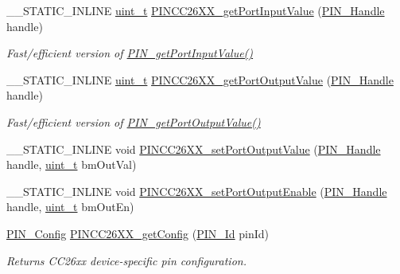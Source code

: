 \begin{DoxyCompactItemize}
\item 
\+\_\+\+\_\+\+S\+T\+A\+T\+I\+C\+\_\+\+I\+N\+L\+I\+N\+E \hyperlink{_p_i_n_8h_a12a1e9b3ce141648783a82445d02b58d}{uint\+\_\+t} \hyperlink{_p_i_n_c_c26_x_x_8h_a3fb51a5114db99572739e97b1577f5b8}{P\+I\+N\+C\+C26\+X\+X\+\_\+get\+Port\+Input\+Value} (\hyperlink{_p_i_n_8h_afb2de52b054638f63c39df1f30a0d88d}{P\+I\+N\+\_\+\+Handle} handle)
\begin{DoxyCompactList}\small\item\em Fast/efficient version of \hyperlink{_p_i_n_8h_a726e06dcb7c0d096efaee431ae7b2aaa}{P\+I\+N\+\_\+get\+Port\+Input\+Value()} \end{DoxyCompactList}\item 
\+\_\+\+\_\+\+S\+T\+A\+T\+I\+C\+\_\+\+I\+N\+L\+I\+N\+E \hyperlink{_p_i_n_8h_a12a1e9b3ce141648783a82445d02b58d}{uint\+\_\+t} \hyperlink{_p_i_n_c_c26_x_x_8h_ad9634c4a5c56298cdb2b26692f480ebe}{P\+I\+N\+C\+C26\+X\+X\+\_\+get\+Port\+Output\+Value} (\hyperlink{_p_i_n_8h_afb2de52b054638f63c39df1f30a0d88d}{P\+I\+N\+\_\+\+Handle} handle)
\begin{DoxyCompactList}\small\item\em Fast/efficient version of \hyperlink{_p_i_n_8h_ae7dedbfc51ba785bb2f546eed5fdd806}{P\+I\+N\+\_\+get\+Port\+Output\+Value()} \end{DoxyCompactList}\item 
\+\_\+\+\_\+\+S\+T\+A\+T\+I\+C\+\_\+\+I\+N\+L\+I\+N\+E void \hyperlink{_p_i_n_c_c26_x_x_8h_ada70a4225a699f50d8ccc15043dc64e7}{P\+I\+N\+C\+C26\+X\+X\+\_\+set\+Port\+Output\+Value} (\hyperlink{_p_i_n_8h_afb2de52b054638f63c39df1f30a0d88d}{P\+I\+N\+\_\+\+Handle} handle, \hyperlink{_p_i_n_8h_a12a1e9b3ce141648783a82445d02b58d}{uint\+\_\+t} bm\+Out\+Val)
\item 
\+\_\+\+\_\+\+S\+T\+A\+T\+I\+C\+\_\+\+I\+N\+L\+I\+N\+E void \hyperlink{_p_i_n_c_c26_x_x_8h_a37faf5e394a2683e5ffa8a609cda70d5}{P\+I\+N\+C\+C26\+X\+X\+\_\+set\+Port\+Output\+Enable} (\hyperlink{_p_i_n_8h_afb2de52b054638f63c39df1f30a0d88d}{P\+I\+N\+\_\+\+Handle} handle, \hyperlink{_p_i_n_8h_a12a1e9b3ce141648783a82445d02b58d}{uint\+\_\+t} bm\+Out\+En)
\item 
\hyperlink{_p_i_n_8h_ae427b7d2925f9b0f3145e455cfdb5841}{P\+I\+N\+\_\+\+Config} \hyperlink{_p_i_n_c_c26_x_x_8h_aef985455a19581bdb47fff4314fc318b}{P\+I\+N\+C\+C26\+X\+X\+\_\+get\+Config} (\hyperlink{_p_i_n_8h_a9ae8197f460bb76ea09a84f47d09921f}{P\+I\+N\+\_\+\+Id} pin\+Id)
\begin{DoxyCompactList}\small\item\em Returns C\+C26xx device-\/specific pin configuration. \end{DoxyCompactList}\item 

\end{DoxyCompactItemize}
